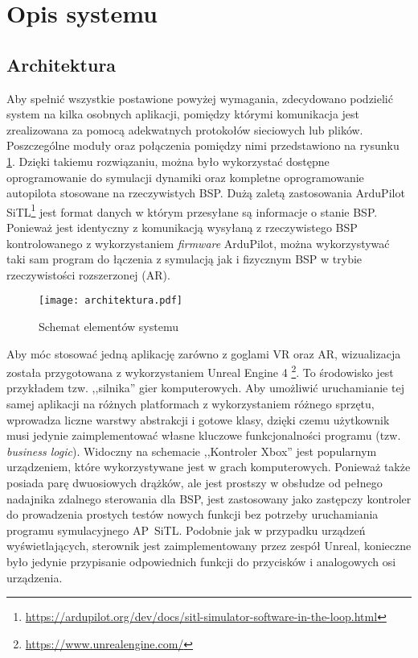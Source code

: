 \newpage
\section{Opis systemu}

\subsection{Architektura}
\label{sec:architektura}

Aby spełnić wszystkie postawione powyżej wymagania, zdecydowano podzielić system na kilka osobnych aplikacji, pomiędzy którymi komunikacja jest zrealizowana za pomocą adekwatnych protokołów sieciowych lub plików. Poszczególne moduły oraz połączenia pomiędzy nimi przedstawiono na rysunku \ref{fig:architektura}. Dzięki takiemu rozwiązaniu, można było wykorzystać dostępne oprogramowanie do symulacji dynamiki oraz kompletne oprogramowanie autopilota stosowane na rzeczywistych BSP. Dużą zaletą zastosowania ArduPilot SiTL\footnote{\url{https://ardupilot.org/dev/docs/sitl-simulator-software-in-the-loop.html}} jest format danych w którym przesyłane są informacje o stanie BSP. Ponieważ jest identyczny z komunikacją wysyłaną z rzeczywistego BSP kontrolowanego z wykorzystaniem \emph{firmware} ArduPilot, można wykorzystywać taki sam program do łączenia z symulacją jak i fizycznym BSP w trybie rzeczywistości rozszerzonej (AR).

\begin{figure}[!h]
    \caption{Schemat elementów systemu}
    \label{fig:architektura}
    \centering \texttt{[image: architektura.pdf]}
\end{figure}

Aby móc stosować jedną aplikację zarówno z goglami VR oraz AR, wizualizacja została przygotowana z wykorzystaniem Unreal Engine 4 \footnote{\url{https://www.unrealengine.com/}}. To środowisko jest przykładem tzw. ,,silnika'' gier komputerowych. Aby umożliwić uruchamianie tej samej aplikacji na różnych platformach z wykorzystaniem różnego sprzętu, wprowadza liczne warstwy abstrakcji i gotowe klasy, dzięki czemu użytkownik musi jedynie zaimplementować własne kluczowe funkcjonalności programu (tzw. \emph{business logic}). Widoczny na schemacie ,,Kontroler Xbox'' jest popularnym urządzeniem, które wykorzystywane jest w grach komputerowych. Ponieważ także posiada parę dwuosiowych drążków, ale jest prostszy w obsłudze od pełnego nadajnika zdalnego sterowania dla BSP, jest zastosowany jako zastępczy kontroler do prowadzenia prostych testów nowych funkcji bez potrzeby uruchamiania programu symulacyjnego AP~SiTL. Podobnie jak w przypadku urządzeń wyświetlających, sterownik jest zaimplementowany przez zespół Unreal, konieczne było jedynie przypisanie odpowiednich funkcji do przycisków i analogowych osi urządzenia.


